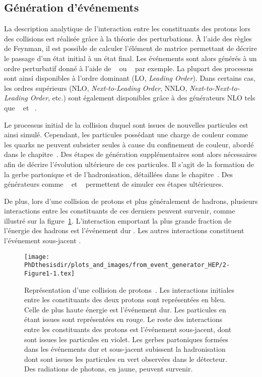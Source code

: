 \subsection{Génération d'événements}\label{chapter-LHC-section-MC-subsec-evt_gen}
La description analytique de l'interaction entre les constituants des protons lors des collisions est réalisée grâce à la théorie des perturbations.
À l'aide des règles de Feynman, il est possible de calculer l'\og élément de matrice \fg{} permettant de décrire le passage d'un état initial à un état final.
Les événements sont alors générés à un ordre perturbatif donné à l'aide de
\MADGRAPH~\cite{madgraph5}
ou
\PYTHIA~\cite{pythia6.4,pythia8.2}
par exemple.
La plupart des processus sont ainsi disponibles à l'ordre dominant (LO, \emph{Leading Order}).
Dans certains cas, les ordres supérieurs (NLO, \emph{Next-to-Leading Order}, NNLO, \emph{Next-to-Next-to-Leading Order}, etc.) sont également disponibles grâce à des générateurs NLO tels que
\POWHEG~\cite{Alioli:2010xd} et
\MCATNLO~\cite{MCATNLO}.
\par Le processus initial de la collision duquel sont issues de nouvelles particules est ainsi simulé.
Cependant, les particules possédant une charge de couleur comme les quarks ne peuvent subsister seules à cause du confinement de couleur, abordé dans le chapitre~.
Des étapes de génération supplémentaires sont alors nécessaires afin de décrire l'évolution ultérieure de ces particules.
Il s'agit de la formation de la gerbe partonique et de l'hadronisation, détaillées dans le chapitre~.
Des générateurs comme
\PYTHIA~\cite{pythia6.4,pythia8.2} et
\HERWIG~\cite{herwig}
permettent de simuler ces étapes ultérieures.
\par De plus, lors d'une collision de protons et plus généralement de hadrons, plusieurs interactions entre les constituants de ces derniers peuvent survenir, comme illustré sur la figure~\ref{fig-event_generator_HEP-2-Figure1-1}.
L'interaction emportant la plus grande fraction de l'énergie des hadrons est l'\og événement dur \fg{}.
Les autres interactions constituent l'\og événement sous-jacent \fg{}.
\begin{figure}[h]
\centering
\texttt{[image: \\PhDthesisdir/plots\_and\_images/from\_event\_generator\_HEP/2-Figure1-1.tex]}
\caption[Représentation d'une collision de protons.]{Représentation d'une collision de protons~\cite{event_generator_HEP}. Les interactions initiales entre les constituants des deux protons sont représentées en bleu. Celle de plus haute énergie est l'événement dur. Les particules en étant issues sont représentées en rouge. Le reste des interactions entre les constituants des protons est l'événement sous-jacent, dont sont issues les particules en violet. Les gerbes partoniques formées dans les événements dur et sous-jacent subissent la hadronisation dont sont issues les particules en vert observées dans le détecteur. Des radiations de photons, en jaune, peuvent survenir.}
\label{fig-event_generator_HEP-2-Figure1-1}
\end{figure}
